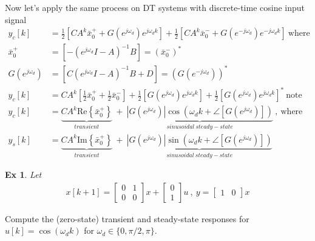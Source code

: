 \documentclass[twoside]{article}
\newtheorem{exmp}[theorem]{Ex}
\begin{document}
Now let's apply the same process on DT systems with discrete-time cosine input signal
%
\begin{align*}
   y_c[k] &= \frac{1}{2} \left[ C A^k \bar{x}_0^+ + G(e^{j \omega_d}) e^{j \omega_d k} \right] + \frac{1}{2} \left[ C A^k \bar{x}_0^- + G(e^{-j \omega_d}) e^{-j \omega_d k}  \right] \ \mathrm{where} \ 
   \\[1ex]
   \bar{x}_0^+ &= \left[ - (e^{j \omega_d } I - A)^{-1} B \right]  = \left(  \bar{x}_0^- \right)^* \\[1ex]
   G(e^{j \omega_d }) &= \left[ C (e^{j \omega_d } I - A)^{-1} B + D \right] = \left( G(e^{-j \omega_d }) \right)^*
   \\[1ex]
   y_c[k] &= C A^k \left[ \frac{1}{2} \bar{x}_0^+ + \frac{1}{2} \bar{x}_0^- \right] +
   \frac{1}{2} \left[ G(e^{j \omega_d}) e^{j \omega_d k} \right] + \frac{1}{2} \left[G(e^{j \omega_d}) e^{j \omega_d k}  \right]^* \ \mathrm{note} 
   \\[1ex]
   y_c[k] &=  \underbrace{C A^k \mathrm{Re}\left\lbrace \bar{x}_0^+ \right\rbrace}_{transient}  \ +  \  \underbrace{| G(e^{j \omega_d})| \cos \left( \omega_d k + \angle [G(e^{j \omega_d})] \right)}_{sinusoidal \ steady-state} \ , \ \mathrm{where}
   \\[1ex]
   y_s[k] &=  \underbrace{C A^k \mathrm{Im}\left\lbrace \bar{x}_0^+ \right\rbrace}_{transient}  \ +  \  \underbrace{| G(e^{j \omega_d})| \sin \left( \omega_d k + \angle [G(e^{j \omega_d})] \right)}_{sinusoidal \ steady-state}
\end{align*}

\begin{exmp}
Let
\begin{align*} 
x[k+1] = \begin{bmatrix} 0 & 1 \\ 0 & 0 \end{bmatrix} x + \begin{bmatrix} 0 \\ 1 \end{bmatrix} u \ , \ y = \begin{bmatrix} 1 & 0 \end{bmatrix} x 
\end{align*}
\end{exmp}
%
Compute the (zero-state) transient and steady-state responses for $u[k] = \cos (\omega_d k)$ for $\omega_d \in \lbrace 0 , \pi / 2  , \pi \rbrace$.
\end{document}
